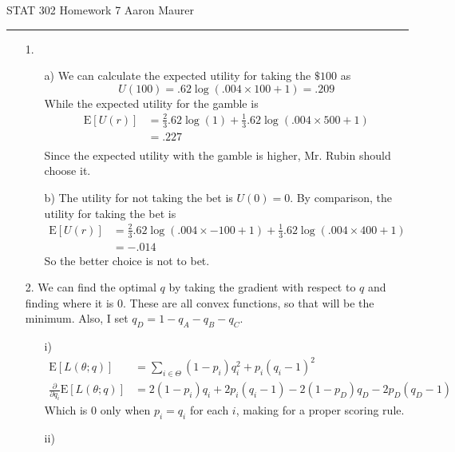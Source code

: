 \documentclass[11pt]{article}
\newcommand{\E}{\mathrm{E}}
\theoremstyle{definition}
\newcommand{\hwhead}[1]{#1 \hfill Aaron Maurer \vspace{2mm} \hrule \vspace{2mm}}
\begin{document}

\hwhead{STAT 302 Homework 7}
\begin{itemize}
    \item[1.]
        \begin{itemize}
            \item[a)]
                We can calculate the expected utility for taking the $\$100$ as
                \[ U(100) = .62\log(.004\times 100 + 1) = .209 \]
                While the expected utility for the gamble is
                \begin{align*}
                    \E[U(r)] &= \frac{2}{3}.62\log(1) + \frac{1}{3}.62\log(.004\times500 + 1) \\ 
                             &= .227 \\ 
                \end{align*}
                Since the expected utility with the gamble is higher, Mr. Rubin should choose it.
            \item[b)]
                The utility for not taking the bet is $U(0)=0$. By comparison, the utility for taking the bet is
                \begin{align*}
                    \E[U(r)] &= \frac{2}{3}.62\log(.004\times-100 + 1) + \frac{1}{3}.62\log(.004\times400 + 1) \\ 
                             &= -.014
                \end{align*}
                So the better choice is not to bet.
        \end{itemize}
    \item[2.]
        We can find the optimal $q$ by taking the gradient with respect to $q$ and finding where it is $0$. These are all convex functions, so that will be the minimum. Also, I set $q_D=1-q_A-q_B-q_C$.
        \begin{itemize}
            \item[i)]
                \begin{align*}
                    \E[L(\theta;q)] &= \sum_{i\in\Theta}(1-p_i)q_i^2 + p_i(q_i-1)^2  \\
                    \frac{\partial}{\partial q_i}\E[L(\theta;q)] &= 2(1-p_i)q_i + 2p_i(q_i-1) - 2(1-p_D)q_D - 2p_D(q_D-1)
                \end{align*}
                Which is $0$ only when $p_i=q_i$ for each $i$, making for a proper scoring rule.
            \item[ii)]

\end{itemize}
\end{itemize}
\end{document}
